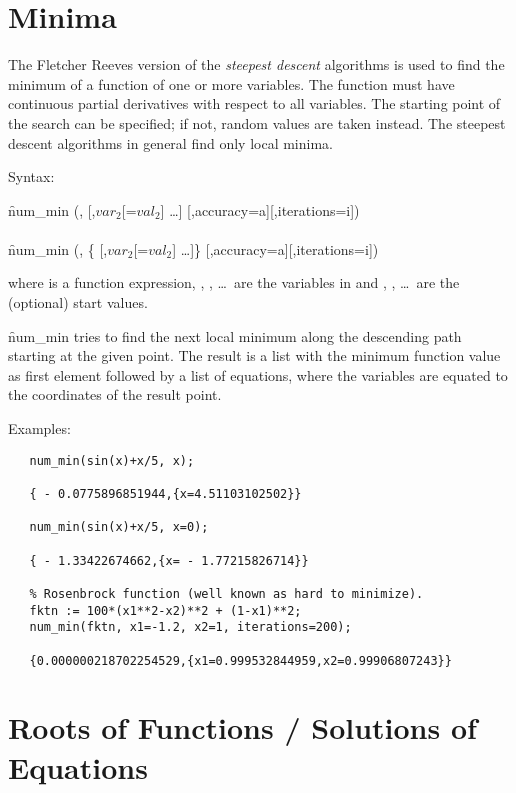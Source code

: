 \section{Minima}
\hypertarget{operator:NUM_MIN}{}

The Fletcher Reeves version of the \emph{steepest descent}
algorithms is used to find the minimum of a
function of one or more variables. The
function must have continuous partial derivatives with respect to all
variables. The starting point of the search can be
specified; if not, random values are taken instead.
The steepest descent algorithms in general find only local
minima.

Syntax:
\begin{syntaxtable}
  \f{num\_min} (,  [,$var_2$[=$val_2$] \ldots]
             [,accuracy=a][,iterations=i]) \\
\\
  \f{num\_min} (, \{ [,$var_2$[=$val_2$] \ldots]\}
             [,accuracy=a][,iterations=i]) 
\end{syntaxtable}
where  is a function expression, , , \ldots\ are
the variables in  and , , \ldots\  are
the (optional) start values.

\f{num\_min} tries to find the next local minimum along the descending
path starting at the given point. The result is a list
with the minimum function value as first element followed by a list
of equations, where the variables are equated to the coordinates
of the result point.

Examples:
\begin{verbatim}
   num_min(sin(x)+x/5, x);

   { - 0.0775896851944,{x=4.51103102502}}

   num_min(sin(x)+x/5, x=0);

   { - 1.33422674662,{x= - 1.77215826714}}

   % Rosenbrock function (well known as hard to minimize).
   fktn := 100*(x1**2-x2)**2 + (1-x1)**2;
   num_min(fktn, x1=-1.2, x2=1, iterations=200);

   {0.000000218702254529,{x1=0.999532844959,x2=0.99906807243}}

\end{verbatim}

\section{Roots of Functions / Solutions of Equations}
\hypertarget{operator:NUM_SOLVE}{}

